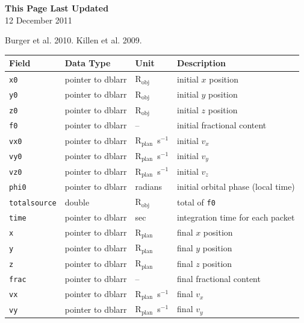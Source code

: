 \documentclass[11pt]{article}
\newcommand\descrip[1]{\textsf{\textbf{\large{#1}}}\\}
\newcommand\Rplan{R$_{\mathrm{plan}}$}
\begin{document}
\descrip{This Page Last Updated}
12 December 2011

\clearpage 

\begin{thebibliography}{}
Burger et al. 2010.
Killen et al. 2009.
\end{thebibliography}
\clearpage


\begin{table}
\begin{tabular}{llll}
\textbf{Field} & \textbf{Data Type} & \textbf{Unit} & \textbf{Description}
  \\ \hline 
\texttt{x0} & pointer to dblarr & R$_\mathrm{obj}$ & initial $x$ position \\
\texttt{y0} & pointer to dblarr & R$_\mathrm{obj}$ & initial $y$ position \\
\texttt{z0} & pointer to dblarr & R$_\mathrm{obj}$ & initial $z$ position \\
\texttt{f0} & pointer to dblarr & -- & initial fractional content \\
\texttt{vx0} & pointer to dblarr & \Rplan\ s$^{-1}$ & initial $v_x$ \\
\texttt{vy0} & pointer to dblarr & \Rplan\ s$^{-1}$ & initial $v_y$ \\
\texttt{vz0} & pointer to dblarr & \Rplan\ s$^{-1}$ & initial $v_z$ \\
\texttt{phi0} & pointer to dblarr & radians & initial orbital phase (local
  time) \\
\texttt{totalsource} & double & R$_\mathrm{obj}$ & total of \texttt{f0} \\
\texttt{time} & pointer to dblarr & sec & integration time for each packet \\
\texttt{x} & pointer to dblarr & \Rplan & final $x$ position \\
\texttt{y} & pointer to dblarr & \Rplan & final $y$ position \\
\texttt{z} & pointer to dblarr & \Rplan & final $z$ position \\
\texttt{frac} & pointer to dblarr & -- & final fractional content \\
\texttt{vx} & pointer to dblarr & \Rplan\ s$^{-1}$ & final $v_x$ \\
\texttt{vy} & pointer to dblarr & \Rplan\ s$^{-1}$ & final $v_y$ \\

\end{tabular}
\end{table}
\end{document}
